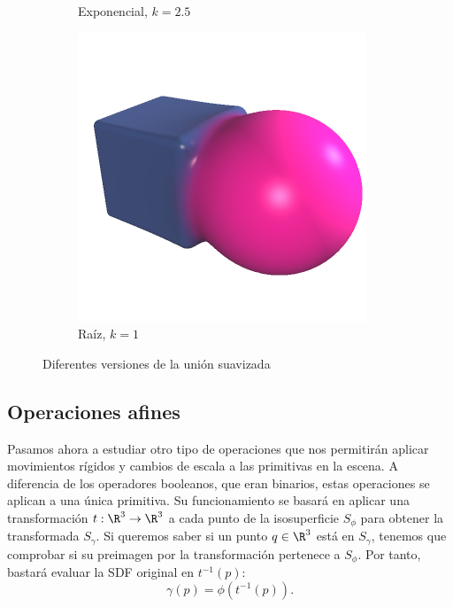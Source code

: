 \begin{figure}[htbp]
\begin{subfigure}[b]{0.25\textwidth}
        \caption{Exponencial, $k=2.5$}
    \end{subfigure}
    \hfill
    \begin{subfigure}[b]{0.25\textwidth}
        \centering
        \includegraphics[width=\textwidth]{Plantilla-TFG-master/img/unionMethodRoot.png}
        \caption{Raíz, $k=1$}
    \end{subfigure}
    
    \caption{Diferentes versiones de la unión suavizada}
    \label{fig:smoothVS}
\end{figure}

\subsection{Operaciones afines}
Pasamos ahora a estudiar otro tipo de operaciones que nos permitirán aplicar movimientos rígidos y cambios de escala a las primitivas en la escena. A diferencia de los operadores booleanos, que eran binarios, estas operaciones se aplican a una única primitiva. Su funcionamiento se basará en aplicar una transformación $t:\R^3\to \R^3$ a cada punto de la isosuperficie $S_{\phi}$ para obtener la transformada $S_{\gamma}$. Si queremos saber si un punto $q\in\R^3$ está en $S_{\gamma}$, tenemos que comprobar si su preimagen por la transformación pertenece a $S_{\phi}$. Por tanto, bastará evaluar la SDF original en $t^{-1}(p)$:
\begin{equation*}
    \gamma(p) = \phi(t^{-1}(p)).
\end{equation*}

